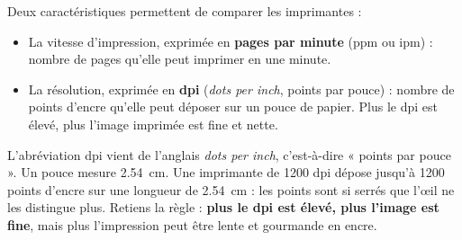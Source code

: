 \documentclass[11pt]{article}
\newcommand{\cle}[1]{{\popxbold\color{popdark}#1}}
\begin{document}
Deux caractéristiques permettent de comparer les imprimantes :

\begin{definition}
\begin{itemize}
\item La \cle{vitesse d'impression}, exprimée en \textbf{pages par minute} (ppm ou ipm) : nombre de pages qu'elle peut imprimer en une minute.
\item La \cle{résolution}, exprimée en \textbf{dpi} (\emph{dots per inch}, points par pouce) : nombre de points d'encre qu'elle peut déposer sur un pouce de papier. Plus le dpi est élevé, plus l'image imprimée est fine et nette.
\end{itemize}
\end{definition}

\begin{savaistu}
L'abréviation \cle{dpi} vient de l'anglais \emph{dots per inch}, c'est-à-dire « points par pouce ». Un pouce mesure \num{2,54}~cm. Une imprimante de 1200 dpi dépose jusqu'à 1200 points d'encre sur une longueur de \num{2,54}~cm : les points sont si serrés que l'œil ne les distingue plus. Retiens la règle : \textbf{plus le dpi est élevé, plus l'image est fine}, mais plus l'impression peut être lente et gourmande en encre.
\end{savaistu}
\end{document}
